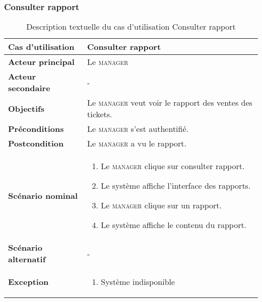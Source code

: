         \subsubsection[Consulter rapport]{Consulter rapport}
        \begin{longtable}{p{4cm} p{9cm}}
            \caption{Description textuelle du cas d’utilisation Consulter rapport}
            \label{table:usecaseConsulterRapportJ}
            \\\hline\hline
                \textbf{Cas d’utilisation} & \textbf{Consulter rapport}
            \\\hline\hline
                    \textbf{Acteur principal} & Le \textsc{manager}
                \\
                    \textbf{Acteur secondaire} & -
                \\
                    \textbf{Objectifs} & Le \textsc{manager} veut voir le rapport des ventes
                    des tickets.
                \\
                    \textbf{Préconditions} & Le \textsc{manager} s’est authentifié.
                \\
                    \textbf{Postcondition} & Le \textsc{manager} a vu le rapport.
                \\
                \textbf{Scénario nominal} &
                    \begin{enumerate}[leftmargin=*]
                        \item Le \textsc{manager} clique sur consulter rapport.
                        \item Le système affiche l’interface des rapports.
                        \item Le \textsc{manager} clique sur un rapport.
                        \item Le système affiche le contenu du rapport.
                    \end{enumerate}
                \\
                \textbf{Scénario alternatif} & -
                \\
                \textbf{Exception} &
                    \begin{enumerate}[leftmargin=*]
                        \item Système indisponible
                    \end{enumerate}
            \\\bottomrule
        \end{longtable}
\pagebreak

